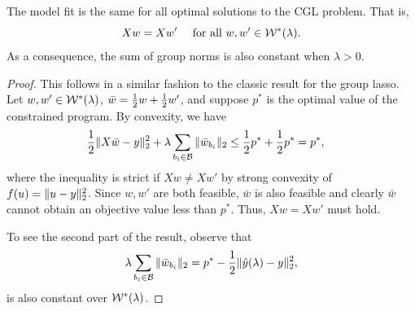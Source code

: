 
\begin{lemma}\label{lemma:unique-fit-cgl}
	The model fit is the same for all optimal solutions to the
	CGL problem.
	That is,
	\[
		X w = X w' \quad \text{ for all } w, w' \in \mathcal{W}^*(\lambda).
	\]
	As a consequence, the sum of group norms is also constant
	when \( \lambda > 0 \).
\end{lemma}
\begin{proof}
	This follows in a similar fashion to the classic result for the group lasso.
	Let \( w, w' \in \mathcal{W}^*(\lambda) \), \( \bar w = \frac 1 2 w + \frac 1 2 w' \),
	and suppose \( p^* \) is the optimal value of the constrained program.
	By convexity, we have
	\begin{align*}
		\frac 1 2 \|X \bar w - y\|_2^2 + \lambda \sum_{{b_i} \in \mathcal{B}} \|\bar{w}_{b_i}\|_2
		 & \leq
		\frac 1 2 p^* + \frac 1 2 p^* = p^*,
	\end{align*}
	where the inequality is strict if \( X w \neq X w' \) by strong convexity
	of \( f(u) = \|u - y\|_2^2 \).
	Since \( w, w' \) are both feasible, \( \bar w \) is also feasible and
	clearly \( \bar w \) cannot obtain an objective value less than \( p^* \).
	Thus, \( X w = X w' \)  must hold.

	To see the second part of the result, observe that
	\[
		\lambda \sum_{{b_i} \in \mathcal{B}} \|\bar{w}_{b_i}\|_2 = p^* - \frac 1 2 \|\hat y(\lambda)  - y\|_2^2,
	\]
	is also constant over \( \mathcal{W}^*(\lambda) \).
\end{proof}


